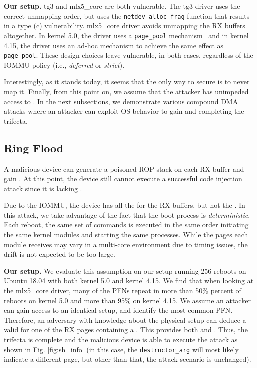 \smallskip
\noindent\textbf{Our setup.} tg3 and mlx5\_core are both vulnerable. The tg3 driver uses the correct unmapping order, but uses the \texttt{netdev\_alloc\_frag} function that results in a type (c) \subpage{} vulnerability. mlx5\_core driver avoids unmapping the RX buffers altogether. In kernel 5.0, the driver uses a \texttt{page\_pool} mechanism~\cite{page_pool} and in kernel 4.15, the driver uses an ad-hoc mechanism to achieve the same effect as \texttt{page\_pool}. These design choices leave \shinfo{} vulnerable, in both cases, regardless of the IOMMU policy (i.e., \emph{deferred} or \emph{strict}). 


Interestingly, as it stands today, it seems that the only way to secure \shinfo{} is to never map it. Finally, from this point on, we assume that the attacker has unimpeded access to \oportunity{}. In the next subsections, we demonstrate various compound DMA attacks where an attacker can exploit OS behavior  to gain \means{} and \motivation{} completing the trifecta.

\subsection{Ring Flood}\label{sec:ringflod}

A malicious device can generate a poisoned ROP stack on each RX buffer and gain \motivation{}. At this point, the device still cannot execute a successful code injection attack since it is lacking \means{}. 

Due to the IOMMU, the device has all the \iova{} for the RX buffers, but not the \kva{}. In this attack, we take advantage of the fact that the boot process is \emph{deterministic}. Each reboot, the same set of commands is executed in the same order initiating the same kernel modules and starting the same processes. While the pages each module receives may vary in a multi-core environment due to timing issues, the drift is not expected to be too large. 

\smallskip
\noindent\textbf{Our setup.} We evaluate this assumption on our setup running 256 reboots on Ubuntu 18.04 with both kernel 5.0 and kernel 4.15.
We find that when looking at the mlx5\_core driver, many of the PFNs repeat in more than 50\% percent of reboots on kernel 5.0 and more than 95\% on kernel 4.15. We assume an attacker can gain access to an identical setup, and identify the most common PFN. Therefore, an adversary with knowledge about the physical setup can deduce a valid \kva{} for one of the RX pages containing a \mabaf. This provides both \means{} and \motivation{}. Thus, the trifecta is complete and the malicious device is able to execute the attack as shown in Fig. \ref{fig:sh_info} (in this case, the \texttt{destructor\_arg} will most likely indicate a different page, but other than that, the attack scenario is unchanged).



